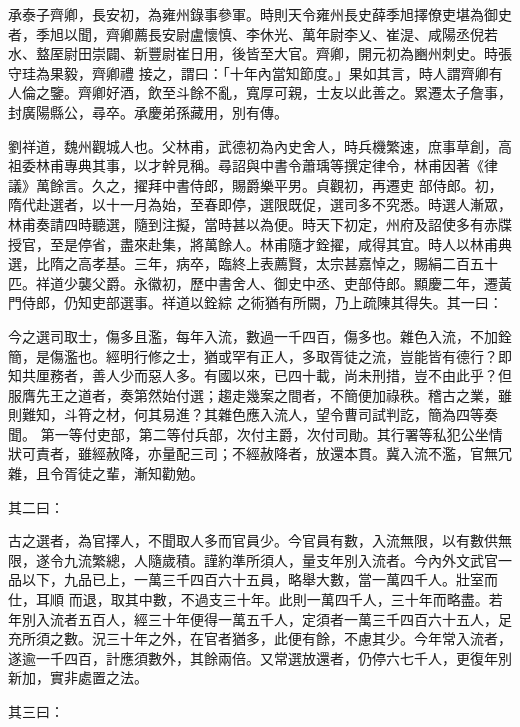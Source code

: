 \begin{pinyinscope}
 承泰子齊卿，長安初，為雍州錄事參軍。時則天令雍州長史薛季旭擇僚吏堪為御史者，季旭以聞，齊卿薦長安尉盧懷慎、李休光、萬年尉李乂、崔湜、咸陽丞倪若水、盩厔尉田崇闢、新豐尉崔日用，後皆至大官。齊卿，開元初為豳州刺史。時張守珪為果毅，齊卿禮
 接之，謂曰：「十年內當知節度。」果如其言，時人謂齊卿有人倫之鑒。齊卿好酒，飲至斗餘不亂，寬厚可親，士友以此善之。累遷太子詹事，封廣陽縣公，尋卒。承慶弟孫藏用，別有傳。



 劉祥道，魏州觀城人也。父林甫，武德初為內史舍人，時兵機繁速，庶事草創，高祖委林甫專典其事，以才幹見稱。尋詔與中書令蕭瑀等撰定律令，林甫因著《律議》萬餘言。久之，擢拜中書侍郎，賜爵樂平男。貞觀初，再遷吏
 部侍郎。初，隋代赴選者，以十一月為始，至春即停，選限既促，選司多不究悉。時選人漸眾，林甫奏請四時聽選，隨到注擬，當時甚以為便。時天下初定，州府及詔使多有赤牒授官，至是停省，盡來赴集，將萬餘人。林甫隨才銓擢，咸得其宜。時人以林甫典選，比隋之高孝基。三年，病卒，臨終上表薦賢，太宗甚嘉悼之，賜絹二百五十匹。祥道少襲父爵。永徽初，歷中書舍人、御史中丞、吏部侍郎。顯慶二年，遷黃門侍郎，仍知吏部選事。祥道以銓綜
 之術猶有所闕，乃上疏陳其得失。其一曰：



 今之選司取士，傷多且濫，每年入流，數過一千四百，傷多也。雜色入流，不加銓簡，是傷濫也。經明行修之士，猶或罕有正人，多取胥徒之流，豈能皆有德行？即知共厘務者，善人少而惡人多。有國以來，已四十載，尚未刑措，豈不由此乎？但服膺先王之道者，奏第然始付選；趨走幾案之間者，不簡便加祿秩。稽古之業，雖則難知，斗筲之材，何其易進？其雜色應入流人，望令曹司試判訖，簡為四等奏聞。
 第一等付吏部，第二等付兵部，次付主爵，次付司勛。其行署等私犯公坐情狀可責者，雖經赦降，亦量配三司；不經赦降者，放還本貫。冀入流不濫，官無冗雜，且令胥徒之輩，漸知勸勉。



 其二曰：



 古之選者，為官擇人，不聞取人多而官員少。今官員有數，入流無限，以有數供無限，遂令九流繁總，人隨歲積。謹約準所須人，量支年別入流者。今內外文武官一品以下，九品已上，一萬三千四百六十五員，略舉大數，當一萬四千人。壯室而仕，耳順
 而退，取其中數，不過支三十年。此則一萬四千人，三十年而略盡。若年別入流者五百人，經三十年便得一萬五千人，定須者一萬三千四百六十五人，足充所須之數。況三十年之外，在官者猶多，此便有餘，不慮其少。今年常入流者，遂逾一千四百，計應須數外，其餘兩倍。又常選放還者，仍停六七千人，更復年別新加，實非處置之法。



 其三曰：




\end{pinyinscope}
